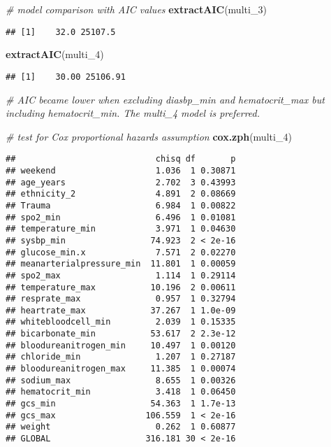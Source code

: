 \documentclass[
]{article}
\newenvironment{Shaded}{\begin{snugshade}}{\end{snugshade}}
\newcommand{\CommentTok}[1]{\textcolor[rgb]{0.56,0.35,0.01}{\textit{#1}}}
\newcommand{\FunctionTok}[1]{\textcolor[rgb]{0.13,0.29,0.53}{\textbf{#1}}}
\newcommand{\NormalTok}[1]{#1}
\begin{document}
\begin{Shaded}
\begin{Highlighting}[]
\CommentTok{\# model comparison with AIC values}
\FunctionTok{extractAIC}\NormalTok{(multi\_3)}
\end{Highlighting}
\end{Shaded}

\begin{verbatim}
## [1]    32.0 25107.5
\end{verbatim}

\begin{Shaded}
\begin{Highlighting}[]
\FunctionTok{extractAIC}\NormalTok{(multi\_4)}
\end{Highlighting}
\end{Shaded}

\begin{verbatim}
## [1]    30.00 25106.91
\end{verbatim}

\begin{Shaded}
\begin{Highlighting}[]
\CommentTok{\# AIC became lower when excluding \textasciigrave{}diasbp\_min\textasciigrave{} and \textasciigrave{}hematocrit\_max\textasciigrave{} but including \textasciigrave{}hematocrit\_min\textasciigrave{}. The \textasciigrave{}multi\_4\textasciigrave{} model is preferred.}

\CommentTok{\# test for Cox proportional hazards assumption}
\FunctionTok{cox.zph}\NormalTok{(multi\_4)}
\end{Highlighting}
\end{Shaded}

\begin{verbatim}
##                            chisq df       p
## weekend                    1.036  1 0.30871
## age_years                  2.702  3 0.43993
## ethnicity_2                4.891  2 0.08669
## Trauma                     6.984  1 0.00822
## spo2_min                   6.496  1 0.01081
## temperature_min            3.971  1 0.04630
## sysbp_min                 74.923  2 < 2e-16
## glucose_min.x              7.571  2 0.02270
## meanarterialpressure_min  11.801  1 0.00059
## spo2_max                   1.114  1 0.29114
## temperature_max           10.196  2 0.00611
## resprate_max               0.957  1 0.32794
## heartrate_max             37.267  1 1.0e-09
## whitebloodcell_min         2.039  1 0.15335
## bicarbonate_min           53.617  2 2.3e-12
## bloodureanitrogen_min     10.497  1 0.00120
## chloride_min               1.207  1 0.27187
## bloodureanitrogen_max     11.385  1 0.00074
## sodium_max                 8.655  1 0.00326
## hematocrit_min             3.418  1 0.06450
## gcs_min                   54.363  1 1.7e-13
## gcs_max                  106.559  1 < 2e-16
## weight                     0.262  1 0.60877
## GLOBAL                   316.181 30 < 2e-16
\end{verbatim}
\end{document}
